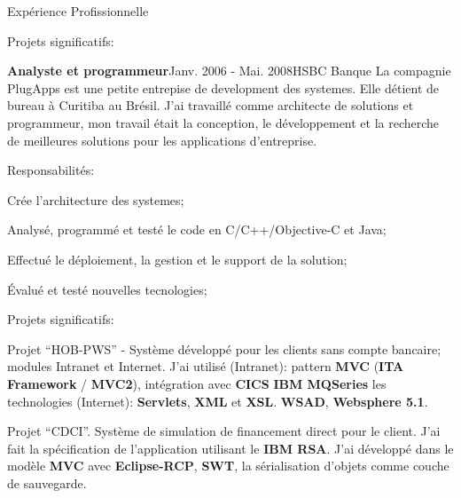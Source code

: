 \documentclass{resume}
\begin{document}
\begin{rSection}{Expérience Profissionnelle}
\begin{rSubsection}{Projets significatifs:}{}{}{}
    \end{rSubsection}
    \begin{rSubsection}{\bf Analyste et programmeur}{Janv. 2006 - Mai. 2008}{HSBC Banque}{}
      La compagnie PlugApps est une petite entrepise de development des systemes. Elle détient de bureau à Curitiba au Brésil. J'ai travaillé comme architecte de solutions et programmeur, mon travail était la conception, le développement et la recherche de meilleures solutions pour les applications d'entreprise.
    \end{rSubsection}
    \begin{rSubsection}{Responsabilités:}{}{}{}
      \item Crée l’architecture des systemes;
      \item Analysé, programmé et testé le code en C/C++/Objective-C et Java;
      \item Effectué le déploiement, la gestion et le support de la solution;
      \item Évalué et testé nouvelles tecnologies;
    \end{rSubsection}
    \begin{rSubsection}{Projets significatifs:}{}{}{}
    \item Projet “HOB-PWS” - Système développé pour les clients sans compte bancaire; modules Intranet et Internet. J’ai utilisé (Intranet): pattern \textbf{MVC} (\textbf{ITA Framework} / \textbf{MVC2}), intégration avec \textbf{CICS} \textbf{IBM MQSeries} les technologies (Internet): \textbf{Servlets}, \textbf{XML} et \textbf{XSL}. \textbf{WSAD}, \textbf{Websphere 5.1}.\\
    \item Projet “CDCI”. Système de simulation de financement direct pour le client. J’ai fait la spécification de l’application utilisant le \textbf{IBM RSA}. J’ai développé dans le modèle \textbf{MVC} avec \textbf{Eclipse-RCP}, \textbf{SWT}, la sérialisation d'objets comme couche de sauvegarde.\\

\end{rSubsection}
\end{rSection}
\end{document}
